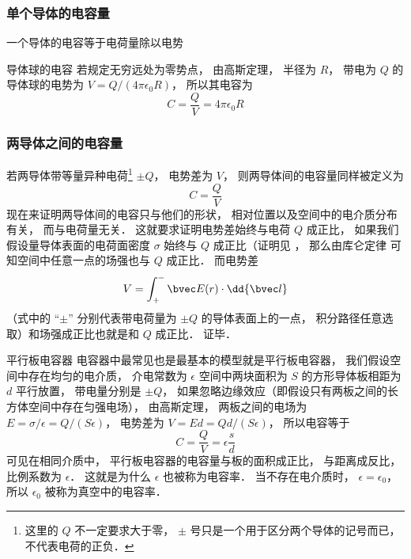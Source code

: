 

\subsubsection{单个导体的电容量}

一个导体的电容等于电荷量除以电势


\begin{example}{导体球的电容}
若规定无穷远处为零势点， 由高斯定理， 半径为 $R$， 带电为 $Q$ 的导体球的电势为 $V = Q/(4\pi\epsilon_0 R)$， 所以其电容为
\begin{equation}\label{Cpctor_eq1}
C = \frac{Q}{V} = 4\pi\epsilon_0 R
\end{equation}
\end{example}


\subsubsection{两导体之间的电容量}
若两导体带等量异种电荷\footnote{这里的 $Q$ 不一定要求大于零， $\pm$ 号只是一个用于区分两个导体的记号而已， 不代表电荷的正负．} $\pm Q$， 电势差为 $V$， 则两导体间的电容量同样被定义为
\begin{equation}
C = \frac{Q}{V}
\end{equation}
现在来证明两导体间的电容只与他们的形状， 相对位置以及空间中的电介质分布有关， 而与电荷量无关． 这就要求证明电势差始终与电荷 $Q$ 成正比， 如果我们假设量导体表面的电荷面密度 $\sigma$ 始终与 $Q$ 成正比（证明见%
， 那么由库仑定律%
可知空间中任意一点的场强也与 $Q$ 成正比． 而电势差
\begin{equation}
V = \int_+^- \bvec E(r) \cdot \dd{\bvec l}
\end{equation}
（式中的 “$\pm$” 分别代表带电荷量为 $\pm Q$ 的导体表面上的一点， 积分路径任意选取）和场强成正比也就是和 $Q$ 成正比． 证毕．

\begin{example}{平行板电容器}\label{Cpctor_exe2}
电容器中最常见也是最基本的模型就是平行板电容器， 我们假设空间中存在均匀的电介质， 介电常数为 $\epsilon$ 空间中两块面积为 $S$ 的方形导体板相距为 $d$ 平行放置， 带电量分别是 $\pm Q$， 如果忽略边缘效应（即假设只有两板之间的长方体空间中存在匀强电场）， 由高斯定理，%
两板之间的电场为 $E = {\sigma}/{\epsilon} = Q/(S\epsilon)$， 电势差为 $V = Ed = Qd/(S\epsilon)$， 所以电容等于
\begin{equation}\label{Cpctor_eq4}
C = \frac{Q}{V} = \epsilon \frac sd
\end{equation}
可见在相同介质中， 平行板电容器的电容量与板的面积成正比， 与距离成反比， 比例系数为 $\epsilon$． 这就是为什么 $\epsilon$ 也被称为电容率． 当不存在电介质时， $\epsilon = \epsilon_0$， 所以 $\epsilon_0$ 被称为真空中的电容率．
\end{example}

